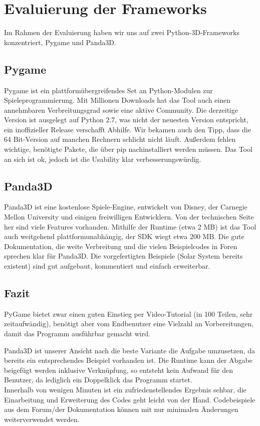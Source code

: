 \documentclass[12pt,a4paper,oneside,ngerman]{scrartcl}
\begin{document}
\section{Evaluierung der Frameworks}
Im Rahmen der Evaluierung haben wir uns auf zwei Python-3D-Frameworks konzentriert, Pygame und Panda3D.
\subsection{Pygame}
Pygame ist ein plattformübergreifendes Set an Python-Modulen zur Spieleprogrammierung. Mit Millionen Downloads hat das Tool auch einen annehmbaren Verbreitungsgrad sowie eine aktive Community. Die derzeitige Version ist ausgelegt auf Python 2.7, was nicht der neuesten Version entspricht, ein inoffizieller Release verschafft Abhilfe. Wir bekamen auch den Tipp, dass die 64 Bit-Version auf manchen Rechnern schlicht nicht läuft. Außerdem fehlen wichtige, benötigte Pakete, die über pip nachinstalliert werden müssen. Das Tool an sich ist ok, jedoch ist die Usability klar verbesserungswürdig.

\subsection{Panda3D}
Panda3D ist eine kostenlose Spiele-Engine, entwickelt von Disney, der Carnegie Mellon University und einigen freiwilligen Entwicklern. Von der technischen Seite her sind viele Features vorhanden. Mithilfe der Runtime (etwa 2 MB) ist das Tool auch weitgehend plattformunabhängig, der SDK wiegt etwa 200 MB. Die gute Dokumentation, die weite Verbreitung und die vielen Beispielcodes in Foren sprechen klar für Panda3D. Die vorgefertigten Beispiele (Solar System bereits existent) sind gut aufgebaut, kommentiert und einfach erweiterbar.

\subsection{Fazit}
PyGame bietet zwar einen guten Einstieg per Video-Tutorial (in 100 Teilen, sehr zeitaufwändig), benötigt aber vom Endbenutzer eine Vielzahl an Vorbereitungen, damit das Programm ausführbar gemacht wird.

Panda3D ist unserer Ansicht nach die beste Variante die Aufgabe umzusetzen, da bereits ein entsprechendes Beispiel vorhanden ist. Die Runtime kann der Abgabe beigefügt werden inklusive Verknüpfung, so entsteht kein Aufwand für den Benutzer, da lediglich ein Doppelklick das Programm startet. \\ 
Innerhalb von wenigen Minuten ist ein zufriedenstellendes Ergebnis sehbar, die Einarbeitung und Erweiterung des Codes geht leicht von der Hand. Codebeispiele aus dem Forum/der Dokumentation können mit nur minimalen Änderungen weiterverwendet werden.
\newpage
\end{document}

